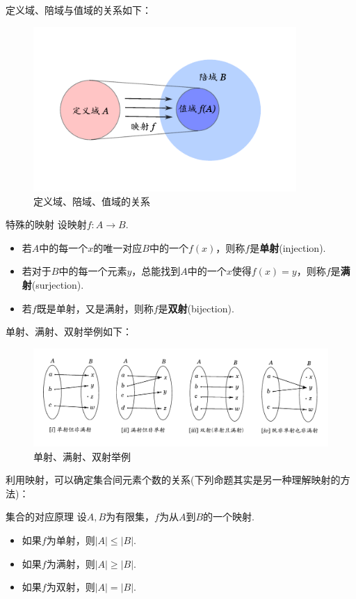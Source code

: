 \documentclass[lang=cn, zihao=5]{elegantbook}
\begin{document}
定义域、陪域与值域的关系如下：

\begin{figure}[h!]
	\centering
	\includegraphics[width=10cm]{attachment/20230403ykue.pdf}
	\caption{定义域、陪域、值域的关系}
\end{figure}

\begin{definition}{特殊的映射}
	设映射$f:A \to B$.
	\begin{itemize}
		\item 若$A$中的每一个$x$的唯一对应$B$中的一个$f(x)$，则称$f$是\textbf{单射}(injection).
		\item 若对于$B$中的每一个元素$y$，总能找到$A$中的一个$x$使得$f(x)=y$，则称$f$是\textbf{满射}(surjection).
		\item 若$f$既是单射，又是满射，则称$f$是\textbf{双射}(bijection).
	\end{itemize}
\end{definition}

单射、满射、双射举例如下：

\begin{figure}[h!]
	\centering
	\includegraphics{attachment/20230403teuuykue.pdf}
	\caption{单射、满射、双射举例}
\end{figure}

利用映射，可以确定集合间元素个数的关系(下列命题其实是另一种理解映射的方法)：

\begin{proposition}{集合的对应原理}
	设$A,B$为有限集，$f$为从$A$到$B$的一个映射. 
	\begin{itemize}
		\item 如果$f$为单射，则$|A| \leq |B|$. 
		\item 如果$f$为满射，则$|A| \geq |B|$. 
		\item 如果$f$为双射，则$|A| = |B|$. 
	\end{itemize}
\end{proposition}
\end{document}
